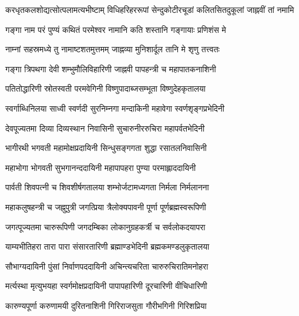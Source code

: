 
{करधृतकलशोद्यत्सोत्पलामत्यभीष्टाम्}
{विधिहरिहररूपां सेन्दुकोटीरचूडां}
{कलितसितदुकूलां जाह्नवीं तां नमामि}


\twolineshloka
{गङ्गा नाम परं पुण्यं कथितं परमेश्वर}
{नामानि कति शस्तानि गङ्गायाः प्रणिशंस मे}

\twolineshloka
{नाम्नां सहस्रमध्ये तु नामाष्टशतमुत्तमम्}
{जाह्नव्या मुनिशार्दूल तानि मे शृणु तत्त्वतः}

\twolineshloka
{गङ्गा त्रिपथगा देवी शम्भुमौलिविहारिणी}
{जाह्नवी पापहन्त्री च महापातकनाशिनी}

\twolineshloka
{पतितोद्धारिणी स्रोतस्वती परमवेगिनी}
{विष्णुपादाब्जसम्भूता विष्णुदेहकृतालया}

\twolineshloka
{स्वर्गाब्धिनिलया साध्वी स्वर्णदी सुरनिम्नगा}
{मन्दाकिनी महावेगा स्वर्णशृङ्गप्रभेदिनी}

\twolineshloka
{देवपूज्यतमा दिव्या दिव्यस्थान निवासिनी}
{सुचारुनीररुचिरा महापर्वतभेदिनी}

\twolineshloka
{भागीरथी भगवती महामोक्षप्रदायिनी}
{सिन्धुसङ्गगता शुद्धा रसातलनिवासिनी}

\twolineshloka
{महाभोगा भोगवती सुभगानन्ददायिनी}
{महापापहरा पुण्या परमाह्लाददायिनी}

\twolineshloka
{पार्वती शिवपत्नी च शिवशीर्षगतालया}
{शम्भोर्जटामध्यगता निर्मला निर्मलानना}

\twolineshloka
{महाकलुषहन्त्री च जह्नुपुत्री जगत्प्रिया}
{त्रैलोक्यपावनी पूर्णा पूर्णब्रह्मस्वरूपिणी}

\twolineshloka
{जगत्पूज्यतमा चारुरूपिणी जगदम्बिका}
{लोकानुग्रहकर्त्री च सर्वलोकदयापरा}

\twolineshloka
{याम्यभीतिहरा तारा पारा संसारतारिणी}
{ब्रह्माण्डभेदिनी ब्रह्मकमण्डलुकृतालया}

\twolineshloka
{सौभाग्यदायिनी पुंसां निर्वाणपददायिनी}
{अचिन्त्यचरिता चारुरुचिरातिमनोहरा}

\twolineshloka
{मर्त्यस्था मृत्युभयहा स्वर्गमोक्षप्रदायिनी}
{पापापहारिणी दूरचारिणी वीचिधारिणी}

\twolineshloka
{कारुण्यपूर्णा करुणामयी दुरितनाशिनी}
{गिरिराजसुता गौरीभगिनी गिरिशप्रिया}

